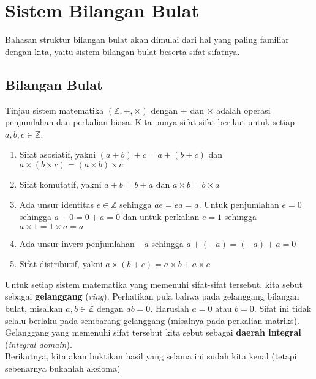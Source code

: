 \chapter{Sistem Bilangan Bulat}
	Bahasan struktur bilangan bulat akan dimulai dari hal yang paling familiar dengan kita, yaitu sistem bilangan bulat beserta sifat-sifatnya.
	\section{Bilangan Bulat}
	Tinjau sistem matematika $(\mathbb{Z},+,\times)$ dengan $+$ dan $\times$ adalah operasi penjumlahan dan perkalian biasa. Kita punya sifat-sifat berikut untuk setiap $a,b,c \in \mathbb{Z}$:
	\begin{enumerate}
		\item Sifat asosiatif, yakni $(a+b)+c = a+(b+c)$ dan $a \times (b \times c) = (a \times b) \times c$
		\item Sifat komutatif, yakni $a+b = b+a$ dan $a \times b = b \times a$
		\item Ada unsur identitas $e \in \mathbb{Z}$ sehingga $ae = ea = a$. Untuk penjumlahan $e = 0$ sehingga $a + 0 = 0 + a = 0$ dan untuk perkalian $e = 1$ sehingga $a \times 1 = 1 \times a = a$
		\item Ada unsur invers penjumlahan $-a$ sehingga $a + (-a) = (-a) + a = 0$
		\item Sifat distributif, yakni $a \times (b + c) = a\times b + a \times c$
	\end{enumerate}
	Untuk setiap sistem matematika yang memenuhi sifat-sifat tersebut, kita sebut sebagai \textbf{gelanggang} (\textit{ring}). Perhatikan pula bahwa pada gelanggang bilangan bulat, misalkan $a,b \in \mathbb{Z}$ dengan $ab = 0$. Haruslah $a = 0$ atau $b = 0$. Sifat ini tidak selalu berlaku pada sembarang gelanggang (misalnya pada perkalian matriks). Gelanggang yang memenuhi sifat tersebut kita sebut sebagai \textbf{daerah integral} (\textit{integral domain}).
	\\
	
	Berikutnya, kita akan buktikan hasil yang selama ini sudah kita kenal (tetapi sebenarnya bukanlah aksioma)
	
